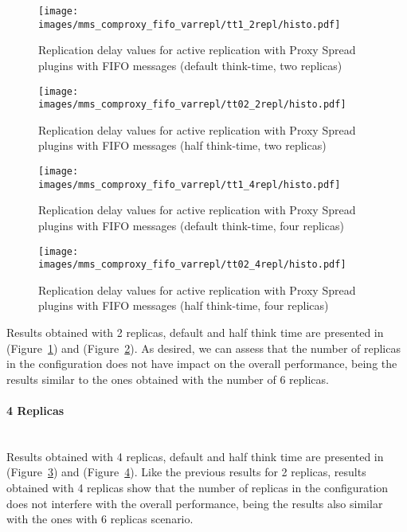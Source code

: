 \begin{figure}[h]
\centering    
\texttt{[image: images/mms\_comproxy\_fifo\_varrepl/tt1\_2repl/histo.pdf]}
\caption{Replication delay values for active replication with Proxy Spread plugins with FIFO messages (default think-time, two replicas)}
\label{fig:mms_comproxy_fifo_2repl_tt1}
\end{figure}

\begin{figure}[t]
\centering    
\texttt{[image: images/mms\_comproxy\_fifo\_varrepl/tt02\_2repl/histo.pdf]}
\caption{Replication delay values for active replication with Proxy Spread plugins with FIFO messages (half think-time, two replicas)}
\label{fig:mms_comproxy_fifo_2repl_tt02}
\end{figure}

\begin{figure}[t]
\centering    
\texttt{[image: images/mms\_comproxy\_fifo\_varrepl/tt1\_4repl/histo.pdf]}
\caption{Replication delay values for active replication with Proxy Spread plugins with FIFO messages (default think-time, four replicas)}
\label{fig:mms_comproxy_fifo_4repl_tt1}
\end{figure}

\begin{figure}[t]
\centering 
\texttt{[image: images/mms\_comproxy\_fifo\_varrepl/tt02\_4repl/histo.pdf]}
\caption{Replication delay values for active replication with Proxy Spread plugins with FIFO messages (half think-time, four replicas)}
\label{fig:mms_comproxy_fifo_4repl_tt02}
\end{figure}

Results obtained with 2 replicas, default and half think time are presented in (Figure~\ref{fig:mms_comproxy_fifo_2repl_tt1}) and (Figure~\ref{fig:mms_comproxy_fifo_2repl_tt02}). 
As desired, we can assess that the number of replicas in the configuration does not have impact on the overall performance, being the results similar to the ones obtained with the number of 6 replicas.

\paragraph{4 Replicas\\ \\}
\vspace{5mm}


Results obtained with 4 replicas, default and half think time are presented in (Figure~\ref{fig:mms_comproxy_fifo_4repl_tt1}) and (Figure~\ref{fig:mms_comproxy_fifo_4repl_tt02}). Like the previous results for 2 replicas, results obtained with 4 replicas show that the number of replicas in the configuration does not interfere with the overall performance, being the results also similar with the ones with 6 replicas scenario.\\





